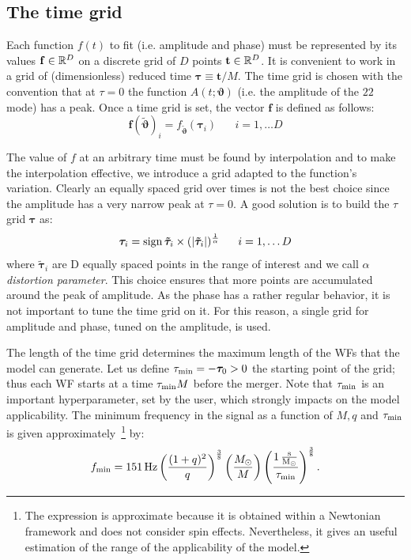 \subsection{The time grid}
Each function $f(t)$ to fit (i.e. amplitude and phase) must be represented by its values $\mathbf{f} \in \mathbb{R}^D$ on a discrete grid of $D$ points $\mathbf{t} \in \mathbb{R}^D$.
It is convenient to work in a grid of (dimensionless) reduced time $\boldsymbol{\tau} \equiv \mathbf{t}/M$.
The time grid is chosen with the convention that at $\tau=0$ the function $A(t;\boldsymbol{\vartheta})$ (i.e. the amplitude of the ${22}$ mode) has a peak.
Once a time grid is set, the vector $\mathbf{f}$ is defined as follows:
\begin{equation}
	\mathbf{f}({\tilde{\boldsymbol{\vartheta}}})_i = f_{{\tilde{\boldsymbol{\vartheta}}}}(\boldsymbol{\tau}_i) \;\;\;\;\;\; i = 1, \ldots D
\end{equation}

The value of $f$ at an arbitrary time must be found by interpolation and to make the interpolation effective,
we introduce a grid adapted to the function's variation.
Clearly an equally spaced grid over times is not the best choice since the amplitude has a very narrow peak at $\tau=0$.
A good solution is to build the $\tau$ grid ${\boldsymbol{\tau}}$ as:
\begin{equation} \label{eq:tau_grid}
	{\boldsymbol{\tau}}_i = \operatorname{sign}{\boldsymbol{\tilde{\tau}}_i} \times (|\boldsymbol{\tilde{\tau}}_i|)^{\frac{1}{\alpha}} \;\;\;\;\;\; i = 1, \ldots D
\end{equation}
where $\boldsymbol{\tilde{\tau}}_i$ are D equally spaced points in the range of interest and we call $\alpha$ \textit{distortion parameter}.
This choice ensures that more points are accumulated around the peak of amplitude.
As the phase has a rather regular behavior, it is not important to tune the time grid on it. For this reason, a single grid for amplitude and phase, tuned on the amplitude, is used.

The length of the time grid determines the maximum length of the WFs that the model can generate.
Let us define $\tau_{\rm min} = -{\boldsymbol{\tau}}_0 > 0 $ the starting point of the grid; thus each WF starts 
at a time $\tau_{\rm min} M$ before the merger. Note that $\tau_{\rm min}$ is an important hyperparameter, 
set by the user, which strongly impacts on the model applicability.
The minimum frequency in the signal as a function of $M, q$ and $\tau_{\rm min}$ is given 
approximately~\footnote{The expression is approximate because it is obtained within a Newtonian framework and does not consider spin effects.
Nevertheless, it gives an useful estimation of the range of the applicability of the model.}
by:
\begin{align}\label{eq:f_min}
	f_{\rm min} = \SI{151}{Hz}  \left( \frac{(1+q)^2}{q} \right)^{\frac{3}{8}}  \left( \frac{M_\odot}{M} \right)  \left(\frac{\SI{1}{ \frac{s}{M_\odot}}}{\tau_{\rm min}} \right)^{\frac{3}{8}} .
\end{align} 


